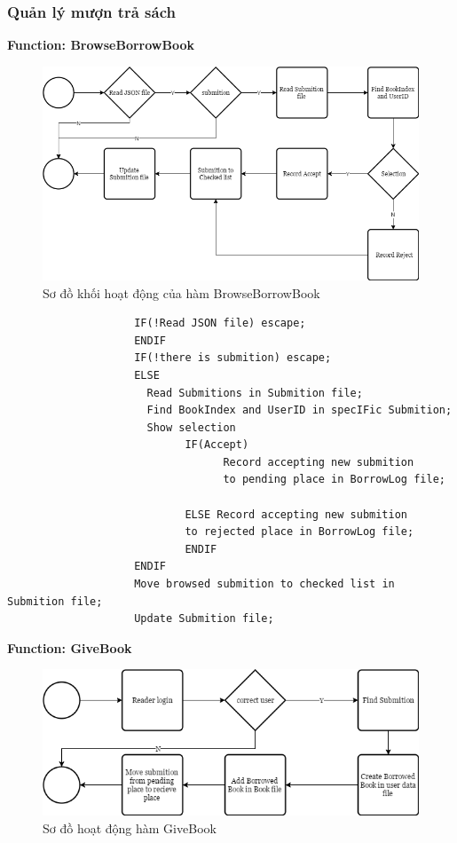 \documentclass[12pt,a4paper]{report}
\begin{document}
            \subsubsection{Quản lý mượn trả sách}
                \textbf{Function: BrowseBorrowBook}
                \begin{figure}[H]
                    \centering
                    \label{F:browsebook}
                    \includegraphics[scale = .4]{browsebook.png}
                    \caption{Sơ đồ khối hoạt động của hàm BrowseBorrowBook}
                \end{figure}
                \begin{verbatim}
                    IF(!Read JSON file) escape;
                    ENDIF
                    IF(!there is submition) escape;
                    ELSE
                      Read Submitions in Submition file;
                      Find BookIndex and UserID in specIFic Submition;
                      Show selection
                            IF(Accept)
                                  Record accepting new submition
                                  to pending place in BorrowLog file;

                            ELSE Record accepting new submition
                            to rejected place in BorrowLog file;
                            ENDIF
                    ENDIF
                    Move browsed submition to checked list in Submition file;
                    Update Submition file;
                \end{verbatim}
                \newpage
                \textbf{Function: GiveBook}
                \begin{figure}[H]
                    \centering
                    \label{G:givebook}
                    \includegraphics[scale = .4]{givebook.png}
                    \caption{Sơ đồ hoạt động hàm GiveBook}
                \end{figure}
\end{document}
